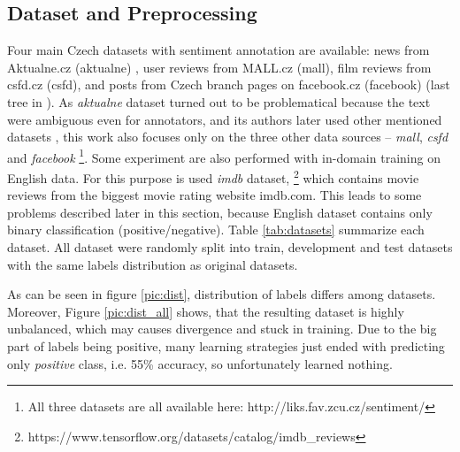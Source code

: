 \subsection{Dataset and Preprocessing}
Four main Czech datasets with sentiment annotation are available: news from Aktualne.cz (aktualne) \citep{Veselovska}, user reviews from MALL.cz (mall), film reviews from csfd.cz (csfd), and posts from Czech branch pages on facebook.cz (facebook) (last tree in \citep{Habernal.et.al.2013}). As \textit{aktualne} dataset turned out to be problematical because the text were ambiguous even for annotators, and its authors later used other mentioned datasets \citep{Veselovska}, this work also focuses only on the three other data sources -- \textit{mall}, \textit{csfd} and \textit{facebook} \footnote{All three datasets are all available here: http://liks.fav.zcu.cz/sentiment/}. Some experiment are also performed with in-domain training on English data. For this purpose is used \textit{imdb} dataset, \footnote{https://www.tensorflow.org/datasets/catalog/imdb\_reviews} which contains movie reviews from the biggest movie rating website imdb.com. This leads to some problems described later in this section, because English dataset contains only binary classification (positive/negative). Table \ref{tab:datasets} summarize each dataset. All dataset were randomly split into train, development and test datasets with the same labels distribution as original datasets.
\par
As can be seen in figure \ref{pic:dist}, distribution of labels differs among datasets. Moreover, Figure \ref{pic:dist_all} shows, that the resulting dataset is highly unbalanced, which may causes divergence and stuck in training. Due to the big part of labels being positive, many learning strategies just ended with predicting only \textit{positive} class, i.e. 55\% accuracy, so unfortunately learned nothing. 
